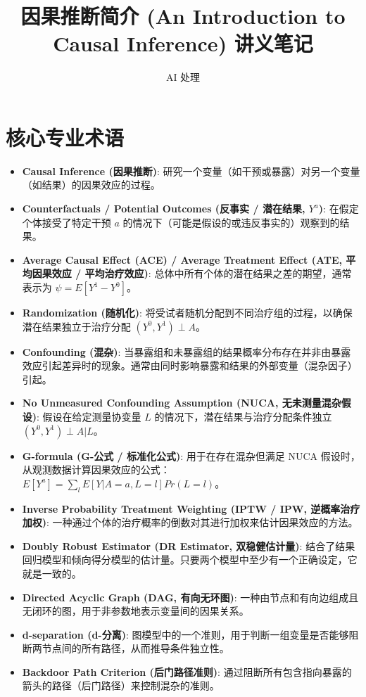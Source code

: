 \documentclass[UTF8]{ctexart}
\title{因果推断简介 (An Introduction to Causal Inference) 讲义笔记}
\author{AI 处理}
\date{}
\begin{document}
\maketitle

\section{核心专业术语}
\begin{itemize}
    \item \textbf{Causal Inference (因果推断)}: 研究一个变量（如干预或暴露）对另一个变量（如结果）的因果效应的过程。
    \item \textbf{Counterfactuals / Potential Outcomes (反事实 / 潜在结果, $Y^a$)}: 在假定个体接受了特定干预 $a$ 的情况下（可能是假设的或违反事实的）观察到的结果。
    \item \textbf{Average Causal Effect (ACE) / Average Treatment Effect (ATE, 平均因果效应 / 平均治疗效应)}: 总体中所有个体的潜在结果之差的期望，通常表示为 $\psi = E[Y^1 - Y^0]$。
    \item \textbf{Randomization (随机化)}: 将受试者随机分配到不同治疗组的过程，以确保潜在结果独立于治疗分配 $(Y^0, Y^1) \perp A$。
    \item \textbf{Confounding (混杂)}: 当暴露组和未暴露组的结果概率分布存在并非由暴露效应引起差异时的现象。通常由同时影响暴露和结果的外部变量（混杂因子）引起。
    \item \textbf{No Unmeasured Confounding Assumption (NUCA, 无未测量混杂假设)}: 假设在给定测量协变量 $L$ 的情况下，潜在结果与治疗分配条件独立 $(Y^0, Y^1) \perp A | L$。
    \item \textbf{G-formula (G-公式 / 标准化公式)}: 用于在存在混杂但满足 NUCA 假设时，从观测数据计算因果效应的公式：$E[Y^a] = \sum_l E[Y|A=a, L=l]Pr(L=l)$。
    \item \textbf{Inverse Probability Treatment Weighting (IPTW / IPW, 逆概率治疗加权)}: 一种通过个体的治疗概率的倒数对其进行加权来估计因果效应的方法。
    \item \textbf{Doubly Robust Estimator (DR Estimator, 双稳健估计量)}: 结合了结果回归模型和倾向得分模型的估计量。只要两个模型中至少有一个正确设定，它就是一致的。
    \item \textbf{Directed Acyclic Graph (DAG, 有向无环图)}: 一种由节点和有向边组成且无闭环的图，用于非参数地表示变量间的因果关系。
    \item \textbf{d-separation (d-分离)}: 图模型中的一个准则，用于判断一组变量是否能够阻断两节点间的所有路径，从而推导条件独立性。
    \item \textbf{Backdoor Path Criterion (后门路径准则)}: 通过阻断所有包含指向暴露的箭头的路径（后门路径）来控制混杂的准则。
\end{itemize}
\end{document}

